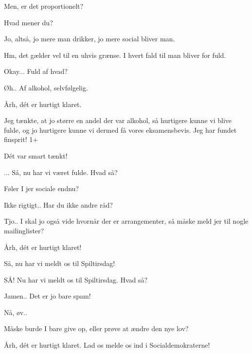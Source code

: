 \documentclass[a4paper,11pt]{article}
\begin{document}
\begin{sketch}
 Men, er det proportionelt?

 Hvad mener du?

 Jo, altså, jo mere man drikker, jo mere social bliver man.

 Hm, det gælder vel til en uhvis grænse. I hvert fald til man bliver for fuld.

 Okay... Fuld af hvad?

 Øh.. Af alkohol, selvfølgelig.

 Årh, dét er hurtigt klaret.


 Jeg tænkte, at jo større en andel der var alkohol, så hurtigere kunne vi blive fulde, og jo hurtigere kunne vi dermed få vores eksamensbevis. Jeg har fundet finsprit! 1+

 Dét var smart tænkt!




 ... Så, nu har vi været fulde. Hvad så?

  Føler I jer sociale endnu?

 Ikke rigtigt.. Har du ikke andre råd?

 Tjo.. I skal jo også vide hvornår der er arrangementer, så måske meld jer til nogle mailinglister?

 Årh, dét er hurtigt klaret!



 Så, nu har vi meldt os til Spiltirsdag!


 SÅ! Nu har vi meldt os til Spiltirsdag. Hvad så?

 Jamen.. Det er jo bare spam!

 Nå, øv..

 Måske burde I bare give op, eller prøve at ændre den nye lov?

 Årh, dét er hurtigt klaret. Lad os melde os ind i Socialdemokraterne!
\end{sketch}
\end{document}
